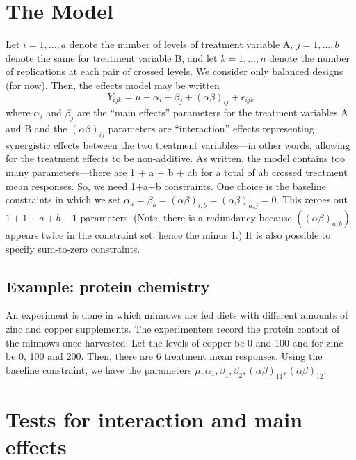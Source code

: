\documentclass[
]{book}
\begin{document}
\hypertarget{the-model}{%
\section{The Model}\label{the-model}}

Let \(i = 1, \ldots, a\) denote the number of levels of treatment variable A, \(j = 1, \ldots, b\) denote the same for treatment variable B, and let \(k = 1, \ldots, n\) denote the number of replications at each pair of crossed levels. We consider only balanced designs (for now). Then, the effects model may be written
\[Y_{ijk} = \mu + \alpha_i + \beta_j + (\alpha\beta)_{ij} + \epsilon_{ijk}\]
where \(\alpha_i\) and \(\beta_j\) are the ``main effects'' parameters for the treatment variables A and B and the \((\alpha\beta)_{ij}\) parameters are ``interaction'' effects representing synergistic effects between the two treatment variables---in other words, allowing for the treatment effects to be non-additive. As written, the model contains too many parameters---there are 1 + a + b + ab for a total of ab crossed treatment mean responses. So, we need 1+a+b constraints. One choice is the baseline constraints in which we set \(\alpha_a = \beta_b = (\alpha\beta)_{i,b} = (\alpha\beta)_{a,j} = 0\). This zeroes out \(1+1+a+b-1\) parameters. (Note, there is a redundancy because \(((\alpha\beta)_{a,b})\) appears twice in the constraint set, hence the minus 1.) It is also possible to specify sum-to-zero constraints.

\hypertarget{example-protein-chemistry}{%
\subsection{Example: protein chemistry}\label{example-protein-chemistry}}

An experiment is done in which minnows are fed diets with different amounts of zinc and copper supplements. The experimenters record the protein content of the minnows once harvested. Let the levels of copper be 0 and 100 and for zinc be 0, 100 and 200. Then, there are 6 treatment mean responses. Using the baseline constraint, we have the parameters \(\mu, \alpha_1, \beta_1, \beta_2, (\alpha\beta)_{11}, (\alpha\beta)_{12}\).

\hypertarget{tests-for-interaction-and-main-effects}{%
\section{Tests for interaction and main effects}\label{tests-for-interaction-and-main-effects}}
\end{document}
